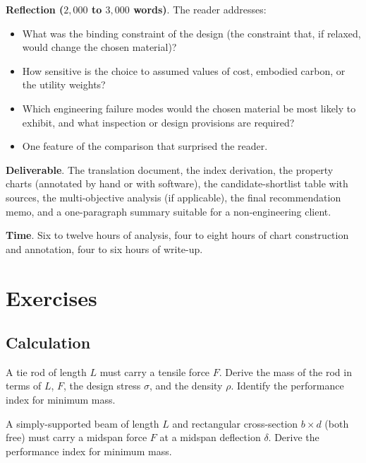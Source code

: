 \begin{project}
\textbf{Reflection ($2{,}000$ to $3{,}000$ words)}. The reader
addresses:

\begin{itemize}[leftmargin=*]
\item What was the binding constraint of the design (the constraint
  that, if relaxed, would change the chosen material)?
\item How sensitive is the choice to assumed values of cost, embodied
  carbon, or the utility weights?
\item Which engineering failure modes would the chosen material be
  most likely to exhibit, and what inspection or design provisions
  are required?
\item One feature of the comparison that surprised the reader.
\end{itemize}

\textbf{Deliverable}. The translation document, the index derivation,
the property charts (annotated by hand or with software), the
candidate-shortlist table with sources, the multi-objective analysis
(if applicable), the final recommendation memo, and a one-paragraph
summary suitable for a non-engineering client.

\textbf{Time}. Six to twelve hours of analysis, four to eight hours of
chart construction and annotation, four to six hours of write-up.
\end{project}

\section{Exercises}

\subsection*{Calculation}

\begin{exercise}
A tie rod of length $L$ must carry a tensile force $F$. Derive the
mass of the rod in terms of $L$, $F$, the design stress $\sigma$, and
the density $\rho$. Identify the performance index for minimum mass.
\end{exercise}

\begin{exercise}
A simply-supported beam of length $L$ and rectangular cross-section
$b \times d$ (both free) must carry a midspan force $F$ at a midspan
deflection $\delta$. Derive the performance index for minimum mass.
\end{exercise}

